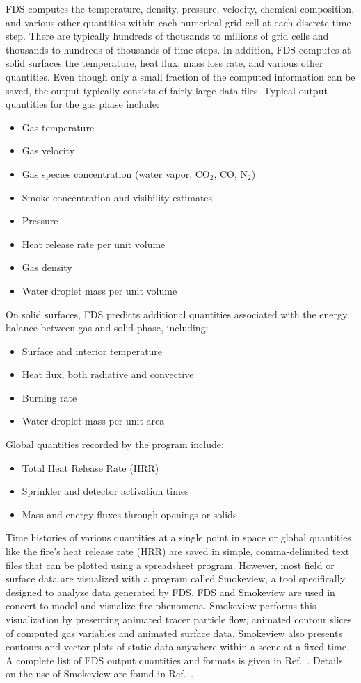 \documentclass[11pt]{book}
\begin{document}
FDS computes the temperature, density, pressure, velocity, chemical composition, and various other quantities within each numerical grid cell at each discrete time step. There are typically hundreds of thousands to millions of grid cells and thousands to hundreds of thousands of time steps. In addition, FDS computes at solid surfaces the temperature, heat flux, mass loss rate, and various other quantities. Even though only a small fraction of the computed information can be saved, the output typically consists of fairly large data files. Typical output quantities for the gas phase include:
\begin{itemize}
\setlength{\itemsep}{0.0in}
\item Gas temperature
\item Gas velocity
\item Gas species concentration (water vapor, CO$_2$, CO, N$_2$)
\item Smoke concentration and visibility estimates
\item Pressure
\item Heat release rate per unit volume
\item Gas density
\item Water droplet mass per unit volume
\end{itemize}
On solid surfaces, FDS predicts additional quantities associated with the energy balance between gas and solid phase, including:
\begin{itemize}
\setlength{\itemsep}{0.0in}
\item Surface and interior temperature
\item Heat flux, both radiative and convective
\item Burning rate
\item Water droplet mass per unit area
\end{itemize}
Global quantities recorded by the program include:
\begin{itemize}
\setlength{\itemsep}{0.0in}
\item Total Heat Release Rate (HRR)
\item Sprinkler and detector activation times
\item Mass and energy fluxes through openings or solids
\end{itemize}
Time histories of various quantities at a single point in space or global quantities like the fire's heat release rate (HRR) are saved in simple, comma-delimited text files that can be plotted using a spreadsheet program. However, most field or surface data are visualized with a program called Smokeview, a tool specifically designed to analyze data generated by FDS. FDS and Smokeview are used in concert to model and visualize fire phenomena. Smokeview performs this visualization by presenting animated tracer particle flow, animated contour slices of computed gas variables and animated surface data. Smokeview also presents contours and vector plots of static data anywhere within a scene at a fixed time. A complete list of FDS output quantities and formats is given in Ref.~\cite{FDS_Users_Guide}. Details on the use of Smokeview are found in Ref.~\cite{Smokeview_Users_Guide}.
\end{document}
